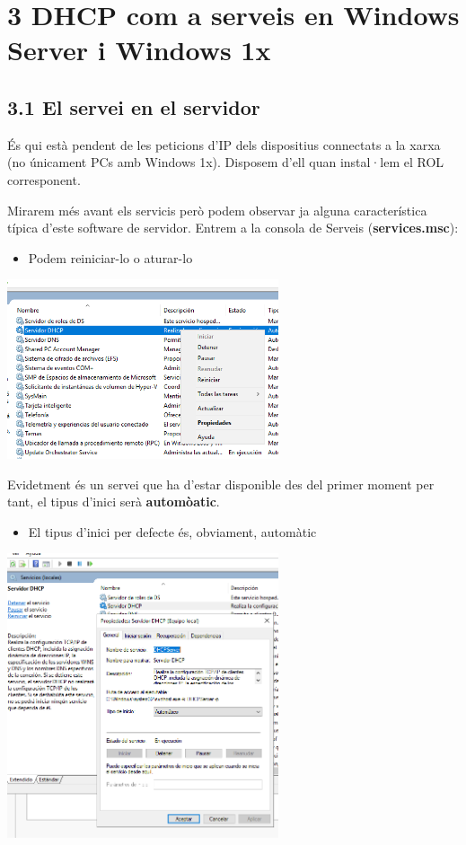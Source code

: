 \documentclass[
  a4paper,
]{article}
\providecommand{\tightlist}{%
  \setlength{\itemsep}{0pt}\setlength{\parskip}{0pt}}
\begin{document}
\section{3 DHCP com a serveis en Windows Server i Windows
1x}\label{dhcp-com-a-serveis-en-windows-server-i-windows-1x}

\subsection{3.1 El servei en el
servidor}\label{el-servei-en-el-servidor}

És qui està pendent de les peticions d'IP dels dispositius connectats a
la xarxa (no únicament PCs amb Windows 1x). Disposem d'ell quan
instal·lem el ROL corresponent.

Mirarem més avant els servicis però podem observar ja alguna
característica típica d'este software de servidor. Entrem a la consola
de Serveis (\textbf{services.msc}):

\begin{itemize}
\tightlist
\item
  Podem reiniciar-lo o aturar-lo
\end{itemize}

\includegraphics[width=0.6\textwidth,height=\textheight]{png/ServiciDHCP0.png}

Evidetment és un servei que ha d'estar disponible des del primer moment
per tant, el tipus d'inici serà \textbf{automòatic}.

\begin{itemize}
\tightlist
\item
  El tipus d'inici per defecte és, obviament, automàtic
\end{itemize}

\includegraphics[width=0.6\textwidth,height=\textheight]{png/ServiciDHCP1.png}
\end{document}

